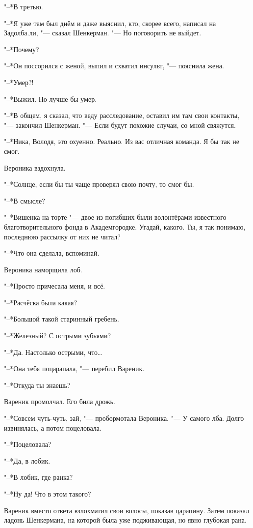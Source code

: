 "--*В третью.

"--*Я уже там был днём и даже выяснил, кто, скорее всего, написал на Задолба.ли, "--- сказал Шенкерман.
"--- Но поговорить не выйдет.

"--*Почему?

"--*Он поссорился с женой, выпил и схватил инсульт, "--- пояснила жена.

"--*Умер?!

"--*Выжил.
Но лучше бы умер.

"--*В общем, я сказал, что веду расследование, оставил им там свои контакты, "--- закончил Шенкерман.
"--- Если будут похожие случаи, со мной свяжутся.

"--*Ника, Володя, это охуенно.
Реально.
Из вас отличная команда.
Я бы так не смог.

Вероника вздохнула.

"--*Солнце, если бы ты чаще проверял свою почту, то смог бы.

"--*В смысле?

"--*Вишенка на торте "--- двое из погибших были волонтёрами известного благотворительного фонда в Академгородке.
Угадай, какого.
Ты, я так понимаю, последнюю рассылку от них не читал?

\asterism

\textspace

"--*Что она сделала, вспоминай.

Вероника наморщила лоб.

"--*Просто причесала меня, и всё.

"--*Расчёска была какая?

"--*Большой такой старинный гребень.

"--*Железный?
С острыми зубьями?

"--*Да.
Настолько острыми, что\dots{}

"--*Она тебя поцарапала, "--- перебил Вареник.

"--*Откуда ты знаешь?

Вареник промолчал.
Его била дрожь.

"--*Совсем чуть-чуть, зай, "--- пробормотала Вероника.
"--- У самого лба.
Долго извинялась, а потом поцеловала.

"--*Поцеловала?

"--*Да, в лобик.

"--*В лобик, где ранка?

"--*Ну да!
Что в этом такого?

Вареник вместо ответа взлохматил свои волосы, показав царапину.
Затем показал ладонь Шенкермана, на которой была уже подживающая, но явно глубокая рана.

